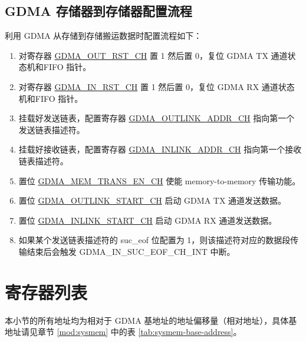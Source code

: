 \documentclass[main\_\_CN.tex]{subfiles}
\begin{document}
\subsection{GDMA 存储器到存储器配置流程}
利用 GDMA 从存储到存储搬运数据时配置流程如下：
\begin{enumerate}
    \item 对寄存器 \hyperref[fielddesc:GDMAOUTRSTCHN]{GDMA\_OUT\_RST\_CH} 置 1 然后置 0，复位 GDMA TX 通道状态机和FIFO 指针。
    \item 对寄存器 \hyperref[fielddesc:GDMAINRSTCHN]{GDMA\_IN\_RST\_CH} 置 1 然后置 0，复位 GDMA RX 通道状态机和FIFO 指针。
    \item 挂载好发送链表，配置寄存器 \hyperref[fielddesc:GDMAOUTLINKADDRCHN]{GDMA\_OUTLINK\_ADDR\_CH} 指向第一个发送链表描述符。
    \item 挂载好接收链表，配置寄存器 \hyperref[fielddesc:GDMAINLINKADDRCHN]{GDMA\_INLINK\_ADDR\_CH} 指向第一个接收链表描述符。
    \item 置位 \hyperref[fielddesc:GDMAMEMTRANSENCHN]{GDMA\_MEM\_TRANS\_EN\_CH} 使能 memory-to-memory 传输功能。
    \item 置位 \hyperref[fielddesc:GDMAOUTLINKSTARTCHN]{GDMA\_OUTLINK\_START\_CH} 启动 GDMA TX 通道发送数据。
    \item 置位 \hyperref[fielddesc:GDMAINLINKSTARTCHN]{GDMA\_INLINK\_START\_CH} 启动 GDMA RX 通道发送数据。
    \item 如果某个发送链表描述符的 suc\_eof 位配置为 1，则该描述符对应的数据段传输结束后会触发 GDMA\_IN\_SUC\_EOF\_CH\_INT 中断。
\end{enumerate}





\clearpage
\hypertarget{dma-reg-summ}{}
\section{寄存器列表}
\label{sec:dma-reg-summ}

本小节的所有地址均为相对于 GDMA 基地址的地址偏移量（相对地址），具体基地址请见章节 \ref{mod:sysmem} \textit{} 中的表 \ref{tab:sysmem-base-address}。
\end{document}
